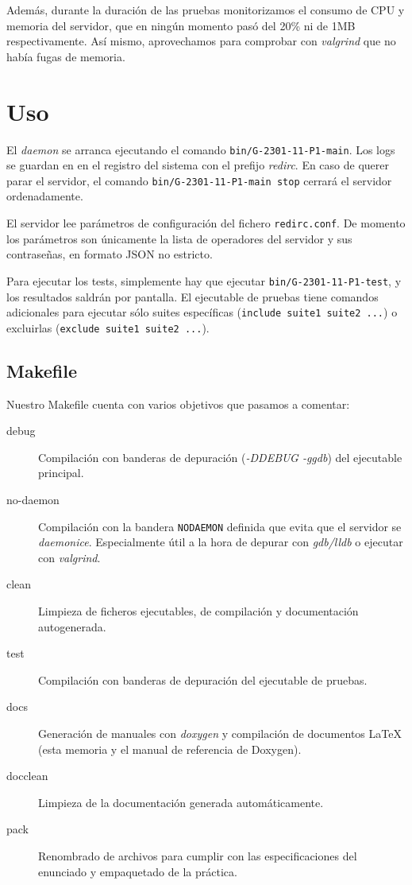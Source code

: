 \documentclass{article}
\begin{document}
Además, durante la duración de las pruebas monitorizamos el consumo de CPU y memoria del servidor, que en ningún momento pasó del 20\% ni de 1MB respectivamente. Así mismo, aprovechamos para comprobar con \textit{valgrind} que no había fugas de memoria.



\section{Uso}

El \textit{daemon} se arranca ejecutando el comando \texttt{bin/G-2301-11-P1-main}. Los logs se guardan en en el registro del sistema con el prefijo \textit{redirc}. En caso de querer parar el servidor, el comando \texttt{bin/G-2301-11-P1-main stop} cerrará el servidor ordenadamente.

El servidor lee parámetros de configuración del fichero \texttt{redirc.conf}. De momento los parámetros son únicamente la lista de operadores del servidor y sus contraseñas, en formato JSON no estricto.

Para ejecutar los tests, simplemente hay que ejecutar \texttt{bin/G-2301-11-P1-test}, y los resultados saldrán por pantalla. El ejecutable de pruebas tiene comandos adicionales para ejecutar sólo suites específicas (\texttt{include suite1 suite2 ...}) o excluirlas (\texttt{exclude suite1 suite2 ...}).

\subsection{Makefile}

Nuestro Makefile cuenta con varios objetivos que pasamos a comentar:

\begin{description}
\item[debug] Compilación con banderas de depuración (\textit{-DDEBUG -ggdb}) del ejecutable principal.
\item[no-daemon] Compilación con la bandera \texttt{NODAEMON} definida que evita que el servidor se \textit{daemonice}. Especialmente útil a la hora de depurar con \textit{gdb/lldb} o ejecutar con \textit{valgrind}.
\item[clean] Limpieza de ficheros ejecutables, de compilación y documentación autogenerada.
\item[test] Compilación con banderas de depuración del ejecutable de pruebas.
\item[docs] Generación de manuales con \textit{doxygen} y compilación de documentos LaTeX (esta memoria y el manual de referencia de Doxygen). 
\item[docclean] Limpieza de la documentación generada automáticamente.
\item[pack] Renombrado de archivos para cumplir con las especificaciones del enunciado y empaquetado de la práctica.
\end{description}
\end{document}
